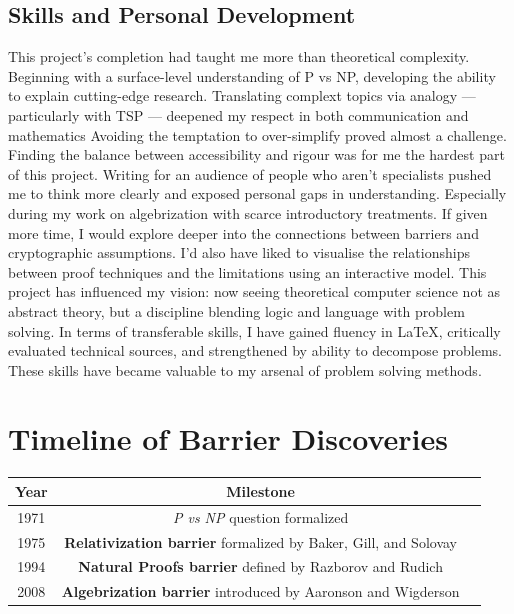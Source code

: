 \documentclass[12pt]{report}
\begin{document}
\subsection*{Skills and Personal Development}
This project's completion had taught me more than theoretical complexity.
Beginning with a surface-level understanding of P vs NP, developing the ability to explain cutting-edge research.
Translating complext topics via analogy --- particularly with TSP --- deepened my respect in both communication and mathematics
Avoiding the temptation to over-simplify proved almost a challenge.
Finding the balance between accessibility and rigour was for me the hardest part of this project.
Writing for an audience of people who aren't specialists pushed me to think more clearly and exposed personal gaps in understanding.
Especially during my work on algebrization with scarce introductory treatments.
If given more time, I would explore deeper into the connections between barriers and cryptographic assumptions.
I'd also have liked to visualise the relationships between proof techniques and the limitations using an interactive model.
This project has influenced my vision: now seeing theoretical computer science not as abstract theory, but a discipline blending logic and language with problem solving.
In terms of transferable skills, I have gained fluency in \LaTeX{}, critically evaluated technical sources, and strengthened by ability to decompose problems.
These skills have became valuable to my arsenal of problem solving methods.

\section*{Timeline of Barrier Discoveries}
\begin{tabular}{|c|c p{10cm}|}
\hline
\textbf{Year} & \textbf{Milestone} \\
\hline
1971 & \textit{P vs NP} question formalized \\
\hline
1975 & \textbf{Relativization barrier} formalized by Baker, Gill, and Solovay \cite{baker1975} \\
\hline
1994 & \textbf{Natural Proofs barrier} defined by Razborov and Rudich \cite{razborov1994} \\
\hline
2008 & \textbf{Algebrization barrier} introduced by Aaronson and Wigderson \cite{arora2009, aaronson2008algebrization} \\
\hline
\end{tabular}

\newpage
\end{document}
